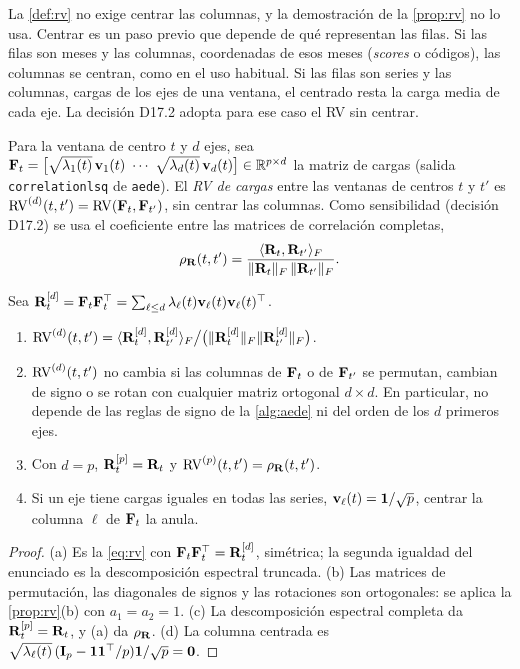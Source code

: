 La \cref{def:rv} no exige centrar las columnas, y la demostración de la \cref{prop:rv} no lo usa.
Centrar es un paso previo que depende de qué representan las filas. Si las filas son meses y las
columnas, coordenadas de esos meses (\emph{scores} o códigos), las columnas se centran, como en el
uso habitual. Si las filas son series y las columnas, cargas de los ejes de una ventana, el
centrado resta la carga media de cada eje. La decisión D17.2 adopta para ese caso el RV sin
centrar.

\begin{definicion}\label{def:rv-cargas}
Para la ventana de centro $t$ y $d$ ejes, sea
$\mF_t=\bigl[\sqrt{\lambda_1(t)}\,\vv_1(t)\ \cdots\ \sqrt{\lambda_d(t)}\,\vv_d(t)\bigr]\in
\RR^{p\times d}$ la matriz de cargas (salida \texttt{correlationlsq} de \texttt{aede}). El
\emph{RV de cargas} entre las ventanas de centros $t$ y $t'$ es $\operatorname{RV}^{(d)}(t,t')=\operatorname{RV}(\mathbf{F}_t,
\mathbf{F}_{t'})$, sin centrar las columnas. Como sensibilidad (decisión D17.2) se usa el coeficiente
entre las matrices de correlación completas,
\[
  \rho_{\mathbf{R}}(t,t')=\frac{\langle \mathbf{R}_t,\mathbf{R}_{t'}\rangle_{F}}{\lVert \mathbf{R}_t\rVert_{F}\,\lVert \mathbf{R}_{t'}\rVert_{F}}.
\]
\end{definicion}

\begin{proposicion}\label{prop:rv-cargas}
Sea $\mathbf{R}^{[d]}_t=\mathbf{F}_t\mathbf{F}_t^{\top}=\sum_{\ell\le d}\lambda_\ell(t)\mathbf{v}_\ell(t)\mathbf{v}_\ell(t)^{\top}$.
\begin{enumerate}[label=(\alph*)]
  \item $\operatorname{RV}^{(d)}(t,t')=\langle \mathbf{R}^{[d]}_t,\mathbf{R}^{[d]}_{t'}\rangle_{F}\big/\bigl(\lVert \mathbf{R}^{[d]}_t\rVert_{F}
    \lVert \mathbf{R}^{[d]}_{t'}\rVert_{F}\bigr)$.
  \item $\operatorname{RV}^{(d)}(t,t')$ no cambia si las columnas de $\mathbf{F}_t$ o de $\mathbf{F}_{t'}$ se permutan, cambian de
    signo o se rotan con cualquier matriz ortogonal $d\times d$. En particular, no depende de las
    reglas de signo de la \cref{alg:aede} ni del orden de los $d$ primeros ejes.
  \item Con $d=p$, $\mathbf{R}^{[p]}_t=\mathbf{R}_t$ y $\operatorname{RV}^{(p)}(t,t')=\rho_{\mathbf{R}}(t,t')$.
  \item Si un eje tiene cargas iguales en todas las series, $\mathbf{v}_\ell(t)=\mathbf{1}/\sqrt p$, centrar la
    columna $\ell$ de $\mathbf{F}_t$ la anula.
\end{enumerate}
\end{proposicion}

\begin{proof}
(a) Es la \cref{eq:rv} con $\mathbf{F}_t\mathbf{F}_t^{\top}=\mathbf{R}^{[d]}_t$, simétrica; la segunda igualdad del
enunciado es la descomposición espectral truncada. (b) Las matrices de permutación, las diagonales
de signos y las rotaciones son ortogonales: se aplica la \cref{prop:rv}(b) con $a_1=a_2=1$.
(c) La descomposición espectral completa da $\mathbf{R}^{[p]}_t=\mathbf{R}_t$, y (a) da $\rho_{\mathbf{R}}$. (d) La
columna centrada es $\sqrt{\lambda_\ell(t)}\,(\mathbf{I}_p-\mathbf{1}\mathbf{1}^{\top}/p)\mathbf{1}/\sqrt p=\mathbf{0}$.
\end{proof}


